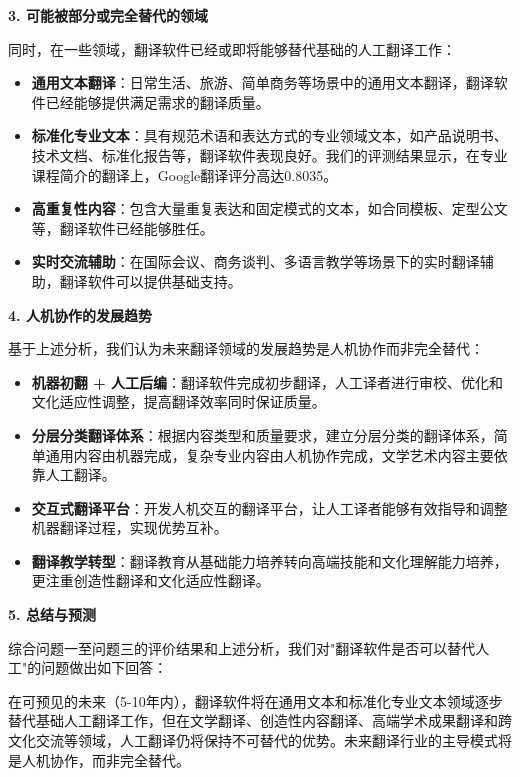 \documentclass[bwprint]{cumcmthesis}
\begin{document}
\textbf{3. 可能被部分或完全替代的领域}

同时，在一些领域，翻译软件已经或即将能够替代基础的人工翻译工作：

\begin{itemize}
    \item \textbf{通用文本翻译}：日常生活、旅游、简单商务等场景中的通用文本翻译，翻译软件已经能够提供满足需求的翻译质量。
    
    \item \textbf{标准化专业文本}：具有规范术语和表达方式的专业领域文本，如产品说明书、技术文档、标准化报告等，翻译软件表现良好。我们的评测结果显示，在专业课程简介的翻译上，Google翻译评分高达0.8035。
    
    \item \textbf{高重复性内容}：包含大量重复表达和固定模式的文本，如合同模板、定型公文等，翻译软件已经能够胜任。
    
    \item \textbf{实时交流辅助}：在国际会议、商务谈判、多语言教学等场景下的实时翻译辅助，翻译软件可以提供基础支持。
\end{itemize}

\textbf{4. 人机协作的发展趋势}

基于上述分析，我们认为未来翻译领域的发展趋势是人机协作而非完全替代：

\begin{itemize}
    \item \textbf{机器初翻 + 人工后编}：翻译软件完成初步翻译，人工译者进行审校、优化和文化适应性调整，提高翻译效率同时保证质量。
    
    \item \textbf{分层分类翻译体系}：根据内容类型和质量要求，建立分层分类的翻译体系，简单通用内容由机器完成，复杂专业内容由人机协作完成，文学艺术内容主要依靠人工翻译。
    
    \item \textbf{交互式翻译平台}：开发人机交互的翻译平台，让人工译者能够有效指导和调整机器翻译过程，实现优势互补。
    
    \item \textbf{翻译教学转型}：翻译教育从基础能力培养转向高端技能和文化理解能力培养，更注重创造性翻译和文化适应性翻译。
\end{itemize}

\textbf{5. 总结与预测}

综合问题一至问题三的评价结果和上述分析，我们对"翻译软件是否可以替代人工"的问题做出如下回答：

在可预见的未来（5-10年内），翻译软件将在通用文本和标准化专业文本领域逐步替代基础人工翻译工作，但在文学翻译、创造性内容翻译、高端学术成果翻译和跨文化交流等领域，人工翻译仍将保持不可替代的优势。未来翻译行业的主导模式将是人机协作，而非完全替代。
\end{document}
